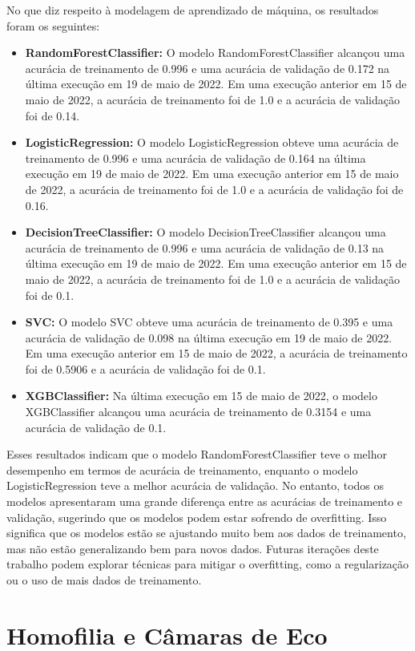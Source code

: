No que diz respeito à modelagem de aprendizado de máquina, os resultados foram os seguintes:

\begin{itemize}
	\item \textbf{RandomForestClassifier:} O modelo RandomForestClassifier alcançou uma acurácia de treinamento de 0.996 e uma acurácia de validação de 0.172 na última execução em 19 de maio de 2022. Em uma execução anterior em 15 de maio de 2022, a acurácia de treinamento foi de 1.0 e a acurácia de validação foi de 0.14.
	\item \textbf{LogisticRegression:} O modelo LogisticRegression obteve uma acurácia de treinamento de 0.996 e uma acurácia de validação de 0.164 na última execução em 19 de maio de 2022. Em uma execução anterior em 15 de maio de 2022, a acurácia de treinamento foi de 1.0 e a acurácia de validação foi de 0.16.
	\item \textbf{DecisionTreeClassifier:} O modelo DecisionTreeClassifier alcançou uma acurácia de treinamento de 0.996 e uma acurácia de validação de 0.13 na última execução em 19 de maio de 2022. Em uma execução anterior em 15 de maio de 2022, a acurácia de treinamento foi de 1.0 e a acurácia de validação foi de 0.1.
	\item \textbf{SVC:} O modelo SVC obteve uma acurácia de treinamento de 0.395 e uma acurácia de validação de 0.098 na última execução em 19 de maio de 2022. Em uma execução anterior em 15 de maio de 2022, a acurácia de treinamento foi de 0.5906 e a acurácia de validação foi de 0.1.
	\item \textbf{XGBClassifier:} Na última execução em 15 de maio de 2022, o modelo XGBClassifier alcançou uma acurácia de treinamento de 0.3154 e uma acurácia de validação de 0.1.
\end{itemize}

Esses resultados indicam que o modelo RandomForestClassifier teve o melhor desempenho em termos de acurácia de treinamento, enquanto o modelo LogisticRegression teve a melhor acurácia de validação. No entanto, todos os modelos apresentaram uma grande diferença entre as acurácias de treinamento e validação, sugerindo que os modelos podem estar sofrendo de overfitting. Isso significa que os modelos estão se ajustando muito bem aos dados de treinamento, mas não estão generalizando bem para novos dados. Futuras iterações deste trabalho podem explorar técnicas para mitigar o overfitting, como a regularização ou o uso de mais dados de treinamento.

\section{Homofilia e Câmaras de Eco}

